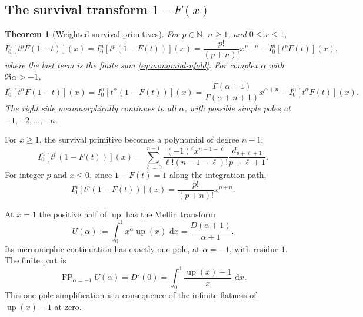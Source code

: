 \documentclass[11pt,oneside]{article}
\numberwithin{equation}{section}
\newtheorem{theorem}{Theorem}[section]
\theoremstyle{definition}
\theoremstyle{remark}
\newcommand{\N}{\mathbb N}
\newcommand{\Up}{\operatorname{up}}
\newcommand{\dd}{\,\mathrm d}
\newcommand{\FP}{\operatorname{FP}}
\begin{document}
\subsection{The survival transform \texorpdfstring{$1-F(x)$}{1-F(x)}}

\begin{theorem}[Weighted survival primitives]
\label{thm:survival}
For $p\in\N$, $n\ge1$, and $0\le x\le1$,
\begin{equation}
 I_0^n[t^pF(1-t)](x)=I_0^n[t^p(1-F(t))](x)
 =\frac{p!}{(p+n)!}x^{p+n}-I_0^n[t^pF(t)](x),                \label{eq:survival-integer}
\end{equation}
where the last term is the finite sum \eqref{eq:monomial-nfold}.  For complex $\alpha$ with
$\Re\alpha>-1$,
\begin{equation}
 I_0^n[t^\alpha F(1-t)](x)=I_0^n[t^\alpha(1-F(t))](x)
 =\frac{\Gamma(\alpha+1)}{\Gamma(\alpha+n+1)}x^{\alpha+n}
  -I_0^n[t^\alpha F(t)](x).                                  \label{eq:survival-fractional}
\end{equation}
The right side meromorphically continues to all $\alpha$, with possible simple poles at
$-1,-2,\ldots,-n$.
\end{theorem}

For $x\ge1$, the survival primitive becomes a polynomial of degree $n-1$:
\begin{equation}
 I_0^n[t^p(1-F(t))](x)
 =\sum_{\ell=0}^{n-1}
 \frac{(-1)^\ell x^{n-1-\ell}}{\ell!(n-1-\ell)!}
 \frac{d_{p+\ell+1}}{p+\ell+1}.                              \label{eq:survival-global-right}
\end{equation}
For integer $p$ and $x\le0$, since $1-F(t)=1$ along the integration path,
\begin{equation}
 I_0^n[t^p(1-F(t))](x)=\frac{p!}{(p+n)!}x^{p+n}.              \label{eq:survival-global-left}
\end{equation}

At $x=1$ the positive half of $\Up$ has the Mellin transform
\begin{equation}
 \boxed{
 U(\alpha):=\int_0^1x^\alpha\Up(x)\,\dd x
 =\frac{D(\alpha+1)}{\alpha+1}.}
 \label{eq:up-Mellin}
\end{equation}
Its meromorphic continuation has exactly one pole, at $\alpha=-1$, with residue $1$.
The finite part is
\begin{equation}
 \FP_{\alpha=-1}U(\alpha)=D'(0)
 =\int_0^1\frac{\Up(x)-1}{x}\,\dd x.                        \label{eq:up-finite-part}
\end{equation}
This one-pole simplification is a consequence of the infinite flatness of $\Up(x)-1$ at
zero.
\end{document}
